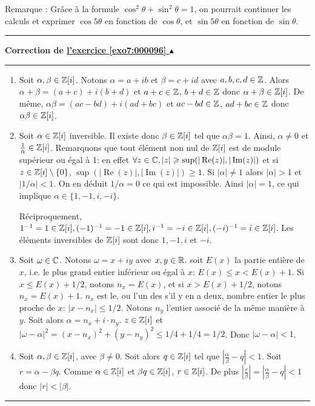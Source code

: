 \documentclass[11pt,a4paper]{article}
\newcounter{exo}
\newcommand{\correction}[1]{\hypertarget{cor7:#1}{}\label{cor7:#1}{\bf Correction de \hyperlink{exo7:#1}{l'exercice \ref{exo7:#1} $\blacktriangle$}}\vspace{1mm}\hrule\vspace{1mm}}
\newcommand{\fincorrection}{\vspace{1mm}\hrule\vspace*{7mm}}
\begin{document}
Remarque : Gr\^ace \`a la formule $\cos^2\theta +\sin^2\theta =1$, on pourrait
 continuer les
calculs et exprimer $\cos 5\theta $ en fonction de $\cos\theta $, et
$\sin 5\theta $ en fonction de $\sin\theta $.
\fincorrection
\correction{000096}
\begin{enumerate}
\item Soit $\alpha,\beta\in\mathbb{Z}[i]$. Notons $\alpha=a+ib$ et $\beta=c+id$ avec $a,b,c,d\in\mathbb{Z}$. Alors
$\alpha+\beta=(a+c)+i(b+d)$ et $a+c\in\mathbb{Z}$, $b+d\in\mathbb{Z}$ donc
$\alpha+\beta\in\mathbb{Z}[i]$. De m\^eme, $\alpha\beta=(ac-bd)+i(ad+bc)$ et
$ac-bd\in\mathbb{Z}$, $ad+bc\in\mathbb{Z}$ donc $\alpha\beta\in\mathbb{Z}[i]$.

\item
Soit $\alpha\in\mathbb{Z}[i]$ inversible. Il existe donc $\beta\in\mathbb{Z}[i]$
tel que $\alpha\beta=1$. Ainsi, $\alpha\neq0$ et
$\frac{1}{\alpha}\in\mathbb{Z}[i]$. Remarquons que tout \'el\'ement non
nul de $\mathbb{Z}[i]$ est de module sup\'erieur ou \'egal \`a 1: en effet
$\forall z\in\mathbb{C}, |z|\geqslant \sup(|\mathop{\mathrm{Re}}\nolimits(z)|,|\mathop{\mathrm{Im}}\nolimits(z)|)$ et si
$z\in\mathbb{Z}[i]\setminus\{0\}$, $\sup(|\mathop{\mathrm{Re}}\nolimits(z)|,|\mathop{\mathrm{Im}}\nolimits(z)|)\geq 1$. Si
$|\alpha|\neq 1$ alors $|\alpha|>1$ et $|1/\alpha|<1$. On en
d\'eduit $1/\alpha=0$ ce qui est impossible. Ainsi $|\alpha|=1$,
ce qui implique $\alpha\in\{1,-1,i,-i\}$.

R\'eciproquement,
$1^{-1}=1\in\mathbb{Z}[i],(-1)^{-1}=-1\in\mathbb{Z}[i],i^{-1}=-i\in\mathbb{Z}[i],(-i)^{-1}=i\in\mathbb{Z}[i]$.
Les \'el\'ements inversibles de $\mathbb{Z}[i]$ sont donc $1,-1,i$ et
$-i$.

\item
Soit $\omega\in\mathbb{C}$. Notons $\omega=x+iy$ avec $x,y\in\mathbb{R}$. soit
$E(x)$ la partie enti\`ere de $x$, i.e. le plus grand entier
inf\'erieur ou \'egal \`a $x$: $E(x)\leq x<E(x)+1$. Si $x\leq E(x)+1/2$, 
notons $n_{x}=E(x)$, et si $x> E(x)+1/2$, notons
$n_{x}=E(x)+1$. $n_{x}$ est le, ou l'un des s'il y en a deux,
nombre entier le plus proche de $x$: $|x-n_{x}|\leq1/2$. Notons
$n_{y}$ l'entier associ\'e de la m\^eme mani\`ere \`a $y$. Soit
alors $\alpha=n_{x}+i \cdot n_{y}$. $z\in\mathbb{Z}[i]$ et
$|\omega-\alpha|^2=(x-n_{x})^2+(y-n_{y})^2\leq 1/4+1/4=1/2$. Donc
$|\omega-\alpha|<1$.

\item
Soit $\alpha,\beta\in\mathbb{Z}[i]$, avec $\beta\neq0$. Soit alors
$q\in\mathbb{Z}[i]$ tel que $|\frac{\alpha}{\beta}-q|<1$. Soit
$r=\alpha-\beta q$. Comme $\alpha\in\mathbb{Z}[i]$ et $\beta q\in\mathbb{Z}[i]$,
$r\in\mathbb{Z}[i]$. De plus
$|\frac{r}{\beta}|=|\frac{\alpha}{\beta}-q|<1$ donc $|r|<|\beta|$.
\end{enumerate}
\fincorrection
\end{document}
